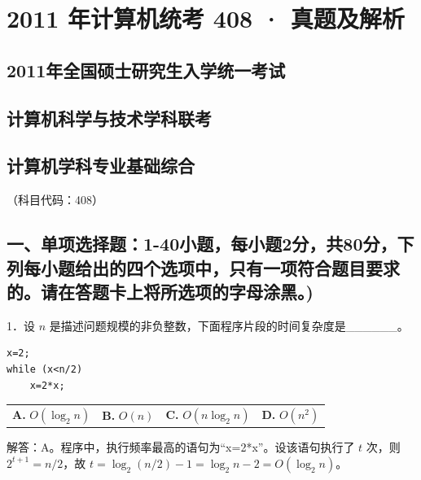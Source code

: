 \documentclass[UTF8,11pt]{ctexart}
\begin{document}
\section*{2011 年计算机统考 408 · 真题及解析}
\subsection*{2011年全国硕士研究生入学统一考试}

\subsection*{计算机科学与技术学科联考}

\subsection*{计算机学科专业基础综合}

（科目代码：408）


\subsection*{一、单项选择题：1-40小题，每小题2分，共80分，下列每小题给出的四个选项中，只有一项符合题目要求的。请在答题卡上将所选项的字母涂黑。)}

1．设 \(\displaystyle n\) 是描述问题规模的非负整数，下面程序片段的时间复杂度是\_\_\_\_\_\_。


\begin{Verbatim}[breaklines,breakanywhere,fontsize=\small]
x=2;
while (x<n/2)
    x=2*x;
\end{Verbatim}

\begin{center}\begin{tabular}{>{\raggedright\arraybackslash}p{\dimexpr(\linewidth-8\tabcolsep)/4\relax}>{\raggedright\arraybackslash}p{\dimexpr(\linewidth-8\tabcolsep)/4\relax}>{\raggedright\arraybackslash}p{\dimexpr(\linewidth-8\tabcolsep)/4\relax}>{\raggedright\arraybackslash}p{\dimexpr(\linewidth-8\tabcolsep)/4\relax}}
\textbf{A.} \(\displaystyle O(\log_2 n)\) & \textbf{B.} \(\displaystyle O(n)\) & \textbf{C.} \(\displaystyle O(n\log_2 n)\) & \textbf{D.} \(\displaystyle O(n^2)\)\\[.35em]\end{tabular}\end{center}

解答：A。程序中，执行频率最高的语句为“x=2*x”。设该语句执行了 \(\displaystyle t\) 次，则 \(\displaystyle 2^{t+1}=n/2\)，故 \(\displaystyle t=\log_2(n/2)-1=\log_2 n-2=O(\log_2 n)\)。
\end{document}
